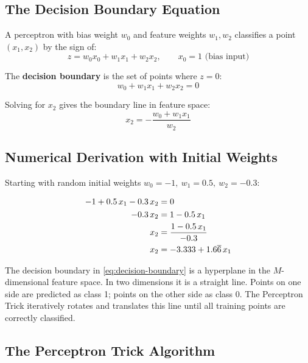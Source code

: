 \documentclass[12pt,a4paper]{article}
\begin{document}
\subsection{The Decision Boundary Equation}
\label{subsec:db-equation}

A perceptron with bias weight $w_0$ and feature weights $w_1, w_2$
classifies a point $(x_1, x_2)$ by the sign of:
\begin{equation}
  z = w_0 x_0 + w_1 x_1 + w_2 x_2, \qquad x_0 = 1 \text{ (bias input)}
  \label{eq:linear-combination}
\end{equation}

The \textbf{decision boundary} is the set of points where $z = 0$:
\begin{equation}
  w_0 + w_1 x_1 + w_2 x_2 = 0
  \label{eq:decision-boundary}
\end{equation}

Solving for $x_2$ gives the boundary line in feature space:
\begin{equation}
  x_2 = -\frac{w_0 + w_1 x_1}{w_2}
  \label{eq:boundary-line}
\end{equation}

\subsection{Numerical Derivation with Initial Weights}
\label{subsec:numerical-db}

Starting with random initial weights $w_0 = -1,\ w_1 = 0.5,\ w_2 = -0.3$:

\begin{align}
  -1 + 0.5\,x_1 - 0.3\,x_2 &= 0 \notag \\
  -0.3\,x_2 &= 1 - 0.5\,x_1 \notag \\
  x_2 &= \frac{1 - 0.5\,x_1}{-0.3} \notag \\
  x_2 &= -3.333 + 1.6\overline{6}\,x_1
  \label{eq:initial-boundary}
\end{align}

\begin{keyinsight}[title=Geometric Interpretation]
The decision boundary in \cref{eq:decision-boundary} is a hyperplane
in the $M$-dimensional feature space.
In two dimensions it is a straight line.
Points on one side are predicted as class 1; points on the other side
as class 0.
The Perceptron Trick iteratively rotates and translates this line until
all training points are correctly classified.
\end{keyinsight}

\subsection{The Perceptron Trick Algorithm}
\label{subsec:perceptron-trick}
\end{document}
